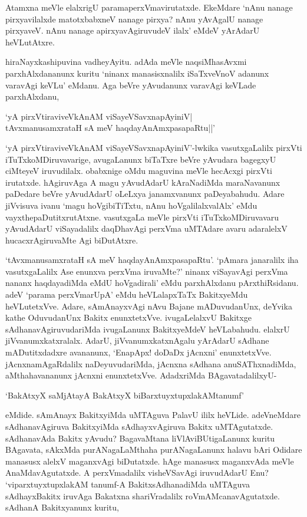 Atamxna meVle elalxrigU paramaperxVmavirutatxde. EkeMdare `nAnu nanage pirxyavilalxde matotxbabxneV nanage pirxya? nAnu yAvAgalU 
nanage pirxyaveV. nAnu nanage apirxyavAgiruvudeV ilalx' eMdeV yArAdarU heVLutAtxre.

hiraNayxkashipuvina vadheyAyitu. adAda meVle naqsiMhasAvxmi parxhAlxdananunx kuritu `ninanx manasisxnalilx iSaTxveVnoV adanunx varavAgi 
keVLu' eMdanu. Aga beVre yAvudanunx varavAgi keVLade parxhAlxdanu,

\begin{shloka}
`yA pirxVtiraviveVkAnAM viSayeVSavxnapAyiniV|\\
tAvxmanusamxrataH sA meV haqdayAnAmx\s pasapaRtu||'
\end{shloka}

`yA pirxVtiraviveVkAnAM viSayeVSavxnapAyiniV'-lwkika vasutxgaLalilx pirxVti iTuTxkoMDiruvavarige, avugaLanunx biTaTxre beVre yAvudara bagegxyU ciMteyeV 
iruvudilalx. obabxnige oMdu maguvina meVle hecAcxgi pirxVti irutatxde. hAgiruvAga A magu yAvudAdarU kAraNadiMda maraNavanunx paDedare 
beVre yAvudAdarU oLeLxya janamxvanunx paDeyabahudu. Adare jiVvisuva ivanu `magu hoVgibiTiTxtu, nAnu hoVgalilalxvalAlx' eMdu vayxthepaDutitxrutAtxne. 
vasutxgaLa meVle pirxVti iTuTxkoMDiruvavaru yAvudAdarU viSayadalilx daqDhavAgi perxVma uMTAdare avaru adaralelxV hucacxrAgiruvaMte Agi biDutAtxre.

`tAvxmanusamxrataH sA meV haqdayAnAmx\s pasapaRtu'. `pAmara janaralilx iha vasutxgaLalilx Ase enunxva perxVma iruvaMte?' ninanx viSayavAgi perxVma nananx 
haqdayadiMda eMdU hoVgadirali' eMdu parxhAlxdanu pArxthiRsidanu. adeV `parama perxVmarUpA' eMdu heVLalapxTaTx BakitxyeMdu heVLutetxVve. 
Adare, sAmAnayxvAgi nAvu Bajane mADuvudanUnx, deYvika kathe OduvudanUnx Bakitx enunxtetxVve. ivugaLelalxvU Bakitxge sAdhanavAgiruvudariMda 
ivugaLanunx BakitxyeMdeV heVLabahudu. elalxrU jiVvanumxkatxralalx. AdarU, jiVvanumxkatxnAgalu yArAdarU sAdhane mADutitxdadxre avananunx, `EnapApx! doDaDx 
jAcnxni' enunxtetxVve. jAcnxnamAgaRdalilx naDeyuvudariMda, jAcnxna sAdhana anuSAThxnadiMda, aMthahavananunx jAcnxni enunxtetxVve. AdadxriMda BAgavatadalilxyU-

\begin{shloka}
`BakAtxyX saMjAtayA BakAtxyX biBarxtuyxtupxlakAMtanumf'
\end{shloka}

eMdide. sAmAnayx BakitxyiMda uMTAguva PalavU ililx heVLide. adeVneMdare sAdhanavAgiruva BakitxyiMda sAdhayxvAgiruva Bakitx uMTAgutatxde. 
sAdhanavAda Bakitx yAvudu? BagavaMtana liVlAviBUtigaLanunx kuritu BAgavata, sAkxMda purANagaLaMthaha purANagaLanunx halavu bAri Odidare manasusx 
alelxV maganxvAgi biDutatxde. hAge manasusx maganxvAda meVle AnaMdavAgutatxde. A perxVmadalilx visheVSavAgi iruvudAdarU Enu? `viparxtuyxtupxlakAM 
tanumf-A BakitxsAdhanadiMda uMTAguva sAdhayxBakitx iruvAga Bakatxna shariVradalilx roVmAMcanavAgutatxde. sAdhanA Bakitxyanunx kuritu,

